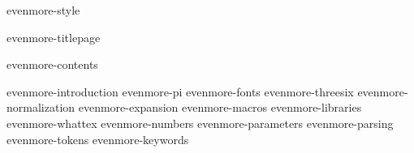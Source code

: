 \environment evenmore-style

\dontcomplain

\startdocument

    \component evenmore-titlepage

    \startfrontmatter
        \component evenmore-contents
    \stopfrontmatter

    \startbodymatter
        \component evenmore-introduction
        \component evenmore-pi
        \component evenmore-fonts
        \component evenmore-threesix
        \component evenmore-normalization
        \component evenmore-expansion
        \component evenmore-macros
        \component evenmore-libraries
        \component evenmore-whattex
        \component evenmore-numbers
        \component evenmore-parameters
        \component evenmore-parsing
        \component evenmore-tokens
        \component evenmore-keywords
    \stopbodymatter

\stopdocument
